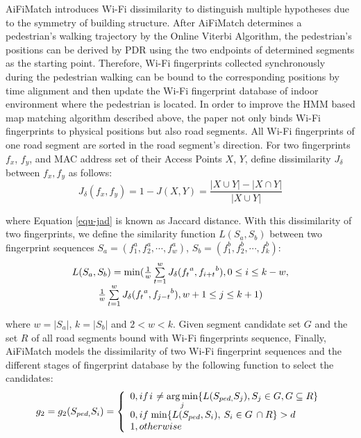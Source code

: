 \documentclass{llncs}
\begin{document}
AiFiMatch introduces Wi-Fi dissimilarity to distinguish multiple hypotheses due to the symmetry of building structure. After AiFiMatch determines a pedestrian's walking trajectory by the Online Viterbi Algorithm, the pedestrian's positions can be derived by PDR using the two endpoints of determined segments as the starting point. Therefore, Wi-Fi fingerprints collected synchronously during the pedestrian walking can be bound to the corresponding positions by time alignment and then update the Wi-Fi fingerprint database of indoor environment where the pedestrian is located. In order to improve the HMM based map matching algorithm described above, the paper not only binds Wi-Fi fingerprints to physical positions but also road segments. All Wi-Fi fingerprints of one road segment are sorted in the road segment's direction. For two fingerprints $f_x$, $f_y$, and MAC address set of their Access Points $X$, $Y$, define dissimilarity $J_{\delta}$ between $f_x,f_y$ as follows:
\begin{equation}
{J_\delta }(f_x,f_y) = 1 - J(X,Y) = \frac{{|X \cup Y| - |X \cap Y|}}{{|X \cup Y|}}
\label{equ-jad}
\end{equation}

where Equation \ref{equ-jad} is known as Jaccard distance. With this dissimilarity of two fingerprints, we define the similarity function $L(S_a, S_b)$ between two fingerprint sequences $S_a = (f_1^a,f_2^a,\cdots,f_w^a)$, $S_b = (f_1^b, f_2^b, \cdots, f_k^b)$:
\begin{equation}
\begin{array}{c}
L({S_a},{\rm{ }}{S_b}) = \min (\frac{1}{w}\sum\limits_{t = 1}^w {{J_\delta }({f_t}^a,{f_{i + t}}^b),0 \le i \le k - w,} \\
\frac{1}{w}\sum\limits_{t = 1}^w {{J_\delta }({f_t}^a,{f_{j - t}}^b),w + 1 \le j \le k + 1} )
\end{array}
\end{equation}

where $w=|S_a|$, $k=|S_b|$ and $2<w<k$. Given segment candidate set $G$ and the set $R$ of all road segments bound with Wi-Fi fingerprints sequence, Finally, AiFiMatch models the dissimilarity of two Wi-Fi fingerprint sequences and the different stages of fingerprint database by the following function to select the candidates: 
\begin{equation}
{g_2} = {g_2}({S_{ped,}}{S_i}) = \left\{ {\begin{array}{*{20}{l}}
	{0,if{\kern 1pt} i{\kern 1pt}  \ne \mathop {\arg \min }\limits_j \{ L({S_{ped,}}{S_j}),{S_j} \in G,G \subseteq R\} }\\
	{0,if{\kern 1pt} \min \{ L({S_{ped}},{S_i}),{\kern 1pt} {\kern 1pt} {S_i} \in G{\kern 1pt} {\kern 1pt}  \cap R\}  > d{\kern 1pt} {\kern 1pt} }\\
	{1,otherwise}
	\end{array}} \right.
\end{equation}
\end{document}
